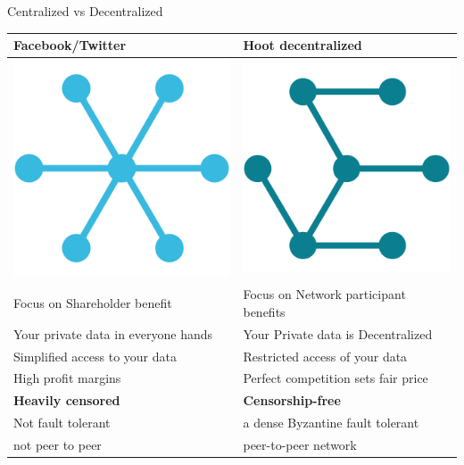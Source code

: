 \documentclass[10pt]{beamer}
\begin{document}
\begin{frame}[t]{Centralized vs Decentralized 
}

	  \begin{tabularx}{\textwidth}{|Y|Y|}
    \hline
      Facebook/Twitter & Hoot decentralized\\
    \hline
      \includegraphics[scale=0.25]{static/cent} & \includegraphics[scale=0.25]{static/dec}\\
      \midrule
  	 Focus on Shareholder benefit  &  Focus on Network participant benefits\\
       Your private data in everyone hands &  Your Private data is Decentralized\\
      Simplified access to your data  &  Restricted access of your data \\
  	 High profit margins  &  Perfect competition sets fair price\\
 \textbf{Heavily censored}  & 	\textbf{Censorship-free}\\
	 Not fault tolerant  & 	a dense Byzantine fault tolerant  \\
 not peer to peer & peer-to-peer network\\
    \hline
    \end{tabularx}
	
\end{frame}
\end{document}
